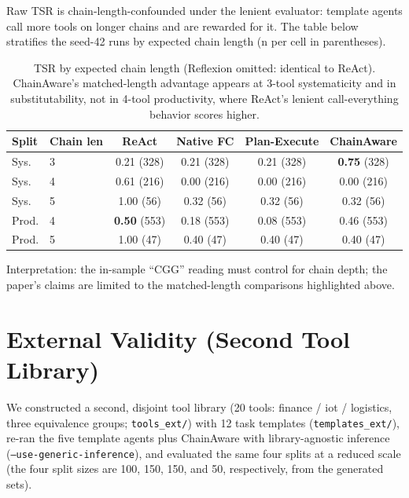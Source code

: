 ﻿\documentclass{article}
\begin{document}
Raw TSR is chain-length-confounded under the lenient evaluator: template
agents call more tools on longer chains and are rewarded for it. The table
below stratifies the seed-42 runs by expected chain length (n per cell in
parentheses).

\begin{table}[h]
\centering
\small
\begin{tabular}{llcccc}
\toprule
Split & Chain len & ReAct & Native FC & Plan-Execute & ChainAware \\
\midrule
Sys. & 3 & 0.21 (328) & 0.21 (328) & 0.21 (328) & \textbf{0.75} (328) \\
Sys. & 4 & 0.61 (216) & 0.00 (216) & 0.00 (216) & 0.00 (216) \\
Sys. & 5 & 1.00 (56) & 0.32 (56) & 0.32 (56) & 0.32 (56) \\
Prod. & 4 & \textbf{0.50} (553) & 0.18 (553) & 0.08 (553) & 0.46 (553) \\
Prod. & 5 & 1.00 (47) & 0.40 (47) & 0.40 (47) & 0.40 (47) \\
\bottomrule
\end{tabular}
\caption{TSR by expected chain length (Reflexion omitted: identical to ReAct).
ChainAware's matched-length advantage appears at 3-tool systematicity and in
substitutability, not in 4-tool productivity, where ReAct's lenient
call-everything behavior scores higher.}
\label{tab:chain_strata}
\end{table}

Interpretation: the in-sample ``CGG'' reading must control for chain depth;
the paper's claims are limited to the matched-length comparisons highlighted
above.

\section{External Validity (Second Tool Library)}

We constructed a second, disjoint tool library (20 tools: finance / iot /
logistics, three equivalence groups; \texttt{tools\_ext/}) with 12 task
templates (\texttt{templates\_ext/}), re-ran the five template agents plus
ChainAware with library-agnostic inference
(\texttt{--use-generic-inference}), and evaluated the same four splits at a
reduced scale (the four split sizes are 100, 150, 150, and 50,
respectively, from the generated sets).
\end{document}

